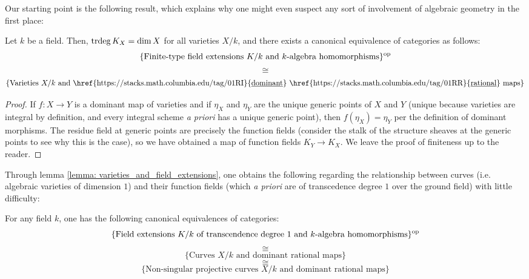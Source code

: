         Our starting point is the following result, which explains why one might even suspect any sort of involvement of algebraic geometry in the first place:
        \begin{lemma} \label{lemma: varieties_and_field_extensions}
            \cite[\href{https://stacks.math.columbia.edu/tag/0BXN}{Tag 0BXN}]{stacks} Let $k$ be a field. Then, $\operatorname{trdeg} K_X = \dim X$ for all varieties $X/k$, and there exists a canonical equivalence of categories as follows:
                $$\{\text{Finite-type field extensions $K/k$ and $k$-algebra homomorphisms}\}^{\mathrm{op}}$$
                $$\cong$$
                $$\{\text{Varieties $X/k$ and \href{https://stacks.math.columbia.edu/tag/01RI}{\underline{dominant}} \href{https://stacks.math.columbia.edu/tag/01RR}{\underline{rational}} maps}\}$$
        \end{lemma}
            \begin{proof}
                If $f: X \to Y$ is a dominant map of varieties and if $\eta_X$ and $\eta_Y$ are the unique generic points of $X$ and $Y$ (unique because varieties are integral by definition, and every integral scheme \textit{a priori} has a unique generic point), then $f(\eta_X) = \eta_Y$ per the definition of dominant morphisms. The residue field at generic points are precisely the function fields (consider the stalk of the structure sheaves at the generic points to see why this is the case), so we have obtained a map of function fields $K_Y \to K_X$. We leave the proof of finiteness up to the reader.
            \end{proof}
        Through lemma \ref{lemma: varieties_and_field_extensions}, one obtains the following regarding the relationship between curves (i.e. algebraic varieties of dimension $1$) and their function fields (which \textit{a priori} are of transcedence degree $1$ over the ground field) with little difficulty:
        \begin{proposition} \label{prop: curves_and_function_fields}
            \cite[\href{https://stacks.math.columbia.edu/tag/0BY1}{Tag 0BY1}]{stacks} For any field $k$, one has the following canonical equivalences of categories:
                $$\{\text{Field extensions $K/k$ of transcendence degree $1$ and $k$-algebra homomorphisms}\}^{\mathrm{op}}$$
                $$\cong$$
                $$\{\text{Curves $X/k$ and dominant rational maps}\}$$
                $$\cong$$
                $$\{\text{Non-singular projective curves $X/k$ and dominant rational maps}\}$$
        \end{proposition}
